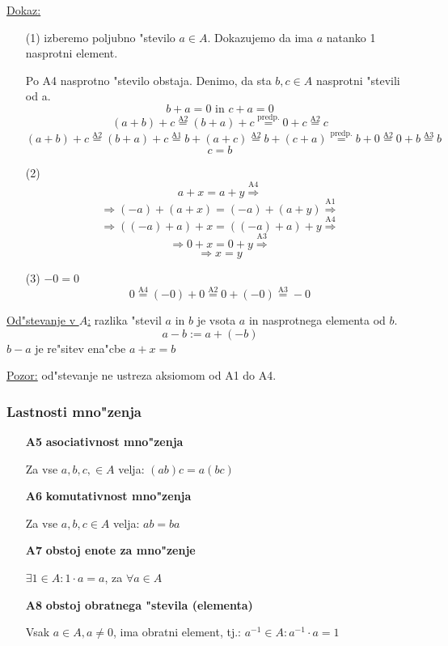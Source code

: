\underline{Dokaz:}
\begin{itemize}
	\item[(1)] izberemo poljubno "stevilo \(a \in A\). Dokazujemo da ima \(a\) natanko 1 nasprotni element.
	
	Po A4 nasprotno "stevilo obstaja. Denimo, da sta \(b, c \in A\) nasprotni "stevili od a.
	\[b + a = 0\text{ in }c + a = 0 \]
	\[(a + b) + c \stackrel{\text{A2}}{=} (b + a) + c \stackrel{\text{predp.}}{=} 0 + c \stackrel{\text{A2}}{=} c\]
	\[(a + b) + c\stackrel{\text{A2}}{=} (b + a) + c \stackrel{\text{A1}}{=} b + (a + c) \stackrel{\text{A2}}{=} b + (c + a) \stackrel{\text{predp.}}{=} b + 0 \stackrel{\text{A2}}{=} 0 + b \stackrel{\text{A3}}{=} b \]
	\[c = b\]
	
	\item[(2)]
	\[a + x = a + y \stackrel{\text{A4}}{\Rightarrow}\]
	\[\Rightarrow (-a) + (a + x) = (-a) + (a + y) \stackrel{\text{A1}}{\Rightarrow}\]
	\[\Rightarrow ((-a) + a) + x = ((-a) + a) + y \stackrel{\text{A4}}{\Rightarrow}\]
	\[\Rightarrow 0 + x = 0 + y \stackrel{\text{A3}}{\Rightarrow}\]
	\[\Rightarrow x = y\]
	
	\item[(3)] \(-0 = 0\)
	\[0 \stackrel{\text{A4}}{=} (-0) + 0 \stackrel{\text{A2}}{=} 0 + (-0) \stackrel{\text{A3}}{=} -0\]
\end{itemize}

\underline{Od"stevanje v \(A\):} razlika "stevil \(a\) in \(b\) je vsota \(a\) in nasprotnega elementa od \(b\).
\[a - b := a + (-b)\]
\(b-a\) je re"sitev ena"cbe \(a + x = b\)

\underline{Pozor:} od"stevanje ne ustreza aksiomom od A1 do A4.

\subsubsection*{Lastnosti mno"zenja}
\begin{itemize}
	\item[\textbf{A5}] \textbf{asociativnost mno"zenja}
	
	Za vse \(a, b, c, \in A\) velja: \((ab)c = a(bc)\)
	\item[\textbf{A6}] \textbf{komutativnost mno"zenja}
	
	Za vse \(a, b, c \in A\) velja: \(ab = ba\)
	\item[\textbf{A7}] \textbf{obstoj enote za mno"zenje}
	
	\(\exists 1 \in A: 1 \cdot a = a\), za \(\forall a \in A\)
	\item[\textbf{A8}] \textbf{obstoj obratnega "stevila (elementa)}
	
	Vsak \(a \in A, a \neq 0\), ima obratni element, tj.: \(a^{-1} \in A: a^{-1} \cdot a = 1\)
\end{itemize}

